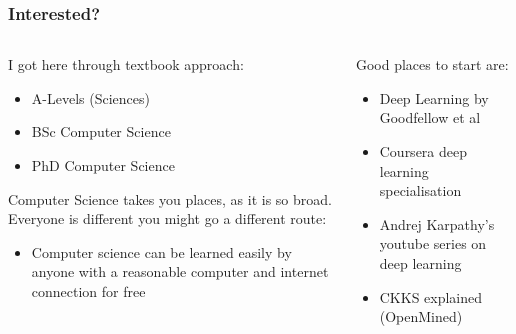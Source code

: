 \documentclass[aspectratio=169]{beamer}
\begin{document}
  \begin{frame}
    \frametitle{Interested?}
    \begin{columns}
      \begin{column}{0.5\textwidth}
        I got here through textbook approach:
        \begin{itemize}
          \item A-Levels (Sciences)
          \item BSc Computer Science
          \item PhD Computer Science
        \end{itemize}
        Computer Science takes you places, as it is so broad.\\
        Everyone is different you might go a different route:
        \begin{itemize}
          \item Computer science can be learned easily by anyone with a reasonable computer and internet connection for free
        \end{itemize}
      \end{column}
      \begin{column}{0.5\textwidth}
        Good places to start are:
        \begin{itemize}
            \item Deep Learning by Goodfellow et al \autocite{Goodfellow-et-al-2016}
            \item Coursera deep learning specialisation
            \item Andrej Karpathy's youtube series on deep learning \autocite{andrejkarpathy}
            \item CKKS explained (OpenMined) \autocite{openmined}
        \end{itemize}
      \end{column}
    \end{columns}
  \end{frame}
\end{document}
